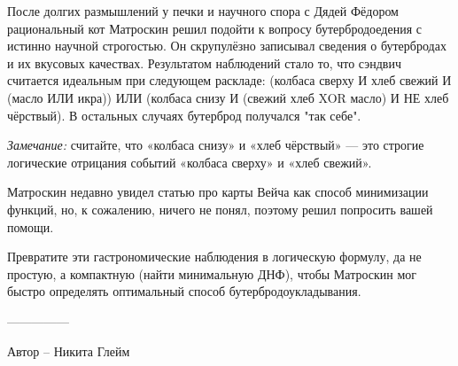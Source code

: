 \question
После долгих размышлений у печки и научного спора с Дядей Фёдором рациональный кот Матроскин решил подойти к вопросу бутербродоедения с истинно научной строгостью. Он скрупулёзно записывал сведения о бутербродах и их вкусовых качествах. Результатом наблюдений стало то,
что сэндвич считается идеальным при следующем раскладе: (колбаса сверху И хлеб свежий И (масло ИЛИ икра)) ИЛИ (колбаса снизу И (свежий хлеб XOR масло) И НЕ хлеб чёрствый). В остальных случаях бутерброд получался "так себе". 

\textit{Замечание:} считайте, что «колбаса снизу» и «хлеб чёрствый» --- это строгие логические отрицания событий «колбаса сверху» и «хлеб свежий».

Матроскин недавно увидел статью про карты Вейча как способ минимизации функций, но, к сожалению, ничего не понял, поэтому решил попросить вашей помощи.

Превратите эти гастрономические наблюдения в логическую формулу, да не простую, а компактную (найти минимальную ДНФ), чтобы Матроскин мог быстро определять оптимальный способ бутербродоукладывания.

---------------

Автор -- Никита Глейм